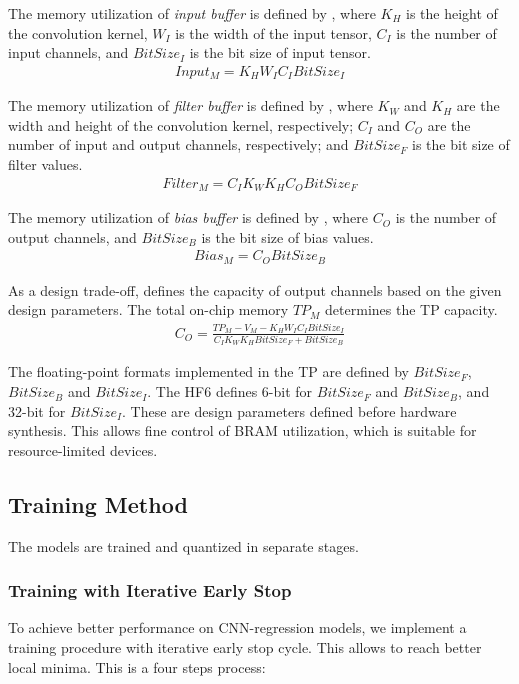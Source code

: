 The memory utilization of \emph{input buffer} is defined by , where $K_{H}$ is the height of the convolution kernel, $W_{I}$ is the width of the input tensor, $C_{I}$ is the number of input channels, and $BitSize_{I}$ is the bit size of input tensor.
\begin{eqnarray} \label{eq:input_memory}
Input_{M}=K_{H}W_{I}C_{I}BitSize_{I}
\end{eqnarray}

The memory utilization of \emph{filter buffer} is defined by , where $K_{W}$ and $K_{H}$ are the width and height of the convolution kernel, respectively; $C_{I}$ and $C_{O}$ are the number of input and output channels, respectively; and $BitSize_{F}$ is the bit size of filter values.
\begin{eqnarray} \label{eq:filter_memory}
Filter_{M}=C_{I}K_{W}K_{H}C_{O}BitSize_{F}
\end{eqnarray}

The memory utilization of \emph{bias buffer} is defined by , where $C_{O}$ is the number of output channels, and $BitSize_{B}$ is the bit size of bias values.
\begin{eqnarray} \label{eq:bias_memory}
Bias_{M}=C_{O}BitSize_{B}
\end{eqnarray}

As a design trade-off,  defines the capacity of output channels based on the given design parameters. The total on-chip memory $TP_{M}$ determines the TP capacity.
\begin{eqnarray} \label{eq:channel_in_memory}
C_{O}=\frac{TP_{M}-V_{M}-K_{H}W_{I}C_{I}BitSize_{I}}{C_{I}K_{W}K_{H}BitSize_{F}+BitSize_{B}}
\end{eqnarray}

The floating-point formats implemented in the TP are defined by $BitSize_F$, $BitSize_B$ and $BitSize_I$. The HF6 defines 6-bit for $BitSize_F$ and $BitSize_B$, and 32-bit for $BitSize_I$. These are design parameters defined before hardware synthesis. This allows fine control of BRAM utilization, which is suitable for resource-limited devices.

\subsection{Training Method}
The models are trained and quantized in separate stages.
\subsubsection{Training with Iterative Early Stop}
To achieve better performance on CNN-regression models, we implement a training procedure with iterative early stop cycle. This allows to reach better local minima. This is a four steps process:

